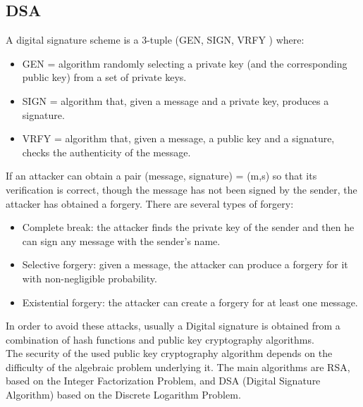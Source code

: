 \documentclass[a4paper, 10pt, titlepage]{article}
\begin{document}
\subsection{DSA}
A digital signature scheme is a 3-tuple (GEN, SIGN, VRFY ) where:
\begin{itemize}
\item GEN = algorithm randomly selecting a private key (and the corresponding public key) from a set of private keys.
\item SIGN = algorithm that, given a message and a private key, produces a signature.
\item VRFY = algorithm that, given a message, a public key and a signature, checks the authenticity of the message.
\end{itemize}
If an attacker can obtain a pair (message, signature) = (m,s) so that its verification is correct, though the message has not been signed by the sender, the attacker has obtained a forgery. There are several types of forgery:
\begin{itemize}
\item Complete break: the attacker finds the private key of the sender and then he can sign any message with the sender’s name.
\item Selective forgery: given a message, the attacker can produce a forgery for it with non-negligible probability.
\item Existential forgery: the attacker can create a forgery for at least one message.
\end{itemize}
In order to avoid these attacks, usually a Digital signature is obtained from a combination of hash functions and public key cryptography algorithms. \\
The security of the used public key cryptography algorithm depends on the difficulty of the algebraic problem underlying it. The main algorithms are RSA, based on the Integer Factorization Problem, and DSA (Digital Signature Algorithm) based on the Discrete Logarithm Problem.


\newpage
\end{document}
